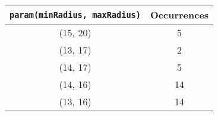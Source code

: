 \documentclass[letterpaper, 12pt]{article}
\begin{document}
\begin{longtable}{|c|c|}
\hline
\textbf{\texttt{param(minRadius, maxRadius)}} & \textbf{Occurrences} \\
\hline
(15, 20) & 5 \\
\hline
(13, 17) & 2 \\
\hline
(14, 17) & 5 \\
\hline
(14, 16) & 14 \\
\hline
(13, 16) & 14 \\
\hline
\end{longtable}
\end{document}
